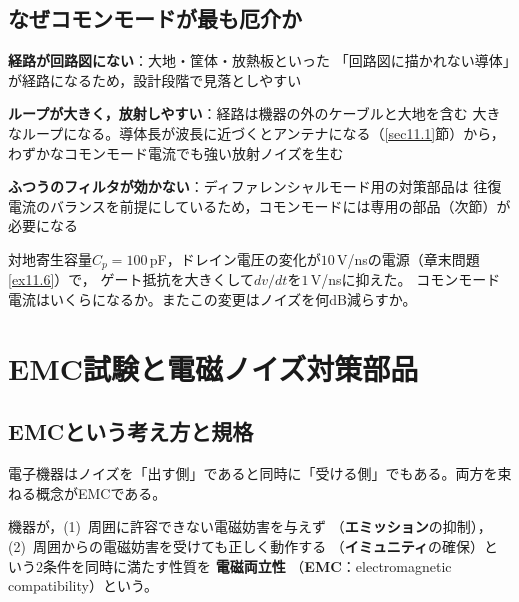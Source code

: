 \subsection{なぜコモンモードが最も厄介か}

\begin{箇条書}
\item \textbf{経路が回路図にない}：大地・筐体・放熱板といった
「回路図に描かれない導体」が経路になるため，設計段階で見落としやすい
\item \textbf{ループが大きく，放射しやすい}：経路は機器の外のケーブルと大地を含む
大きなループになる。導体長が波長に近づくとアンテナになる（\ref{sec11.1}節）から，
わずかなコモンモード電流でも強い放射ノイズを生む
\item \textbf{ふつうのフィルタが効かない}：ディファレンシャルモード用の対策部品は
往復電流のバランスを前提にしているため，コモンモードには専用の部品（次節）が必要になる
\end{箇条書}

\begin{問}
\item 対地寄生容量$C_p = 100$\,pF，ドレイン電圧の変化が$10$\,V/nsの電源（章末問題\ref{ex11.6}）で，
ゲート抵抗を大きくして$dv/dt$を$1$\,V/nsに抑えた。
コモンモード電流はいくらになるか。またこの変更はノイズを何dB減らすか。
\end{問}


\section{EMC試験と電磁ノイズ対策部品}
\label{sec11.7}

\subsection{EMCという考え方と規格}

電子機器はノイズを「出す側」であると同時に「受ける側」でもある。両方を束ねる概念がEMCである。

\begin{定義}
\label{def11.5}
機器が，(1)~周囲に許容できない電磁妨害を与えず
（\textbf{エミッション}の抑制），
(2)~周囲からの電磁妨害を受けても正しく動作する
（\textbf{イミュニティ}の確保）という2条件を同時に満たす性質を
\textbf{電磁両立性}
（\textbf{EMC}：electromagnetic compatibility）という。
\end{定義}

